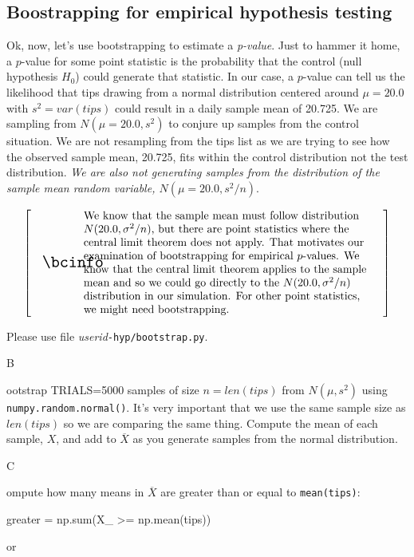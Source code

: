 \documentclass[titlepage]{tufte-book}
\makeatletter
\newcounter{problem}
\newcommand{\step}[1]{{}
\vspace{4pt} \noindent {\bf \theproblem. }#1\addtocounter{problem}{1}}
\newenvironment{callout}[1]{
\[
  \left[
      \begin{tabular}{@{\quad}m{.05\textwidth}@{\qquad}m{.75\textwidth}@{\quad}}
        \scalebox{1.5}{#1} & 
          \raggedright%
}
{
      \end{tabular}
    \right]
\]
}
\makeatother
\begin{document}
\begin{fullwidth}
\subsection{Boostrapping for empirical hypothesis testing}

\setcounter{problem}{1}

Ok, now, let's use bootstrapping to estimate a {\em p-value}.  Just to hammer it home, a $p$-value for some point statistic is the probability that the control (null hypothesis $H_0$) could generate that statistic. In our case, a $p$-value can tell us the likelihood that tips drawing from a normal distribution centered around $\mu=20.0$ with $s^2=var(tips)$ could result in a daily sample mean of 20.725. We are sampling from $N(\mu=20.0,s^2)$ to conjure up samples from the control situation. We are not resampling from the tips list as we are trying to see how the observed sample mean, 20.725, fits within the control distribution not the test distribution. {\em We are also not generating samples from the distribution of the sample mean random variable, $N(\mu=20.0,s^2/n)$}.

\begin{callout}{\bcinfo}
We know that the sample mean must follow distribution $N(20.0, \sigma^2/n)$, but there are point statistics where the central limit theorem does not apply. That motivates our examination of bootstrapping for empirical $p$-values.  We know that the central limit theorem applies to the sample mean and so we could go directly to the $N(20.0, \sigma^2/n)$ distribution in our simulation.  For other point statistics, we might need bootstrapping.
\end{callout}


\noindent Please use file {\em userid}{\tt -hyp/bootstrap.py}.

\step Bootstrap TRIALS=5000 samples of size $n=len(tips)$ from $N(\mu, s^2)$ using {\tt numpy.random.normal()}. It's very important that we use the same sample size as $len(tips)$ so we are comparing the same thing. Compute the mean of each sample, $X$, and add to $\overline{X}$ as you generate samples from the normal distribution.

\step Compute how many means in $\overline{X}$ are greater than or equal to {\tt mean(tips)}:

\begin{pyverbatim}
greater = np.sum(X_ >= np.mean(tips))
\end{pyverbatim}

or


\end{fullwidth}
\end{document}
